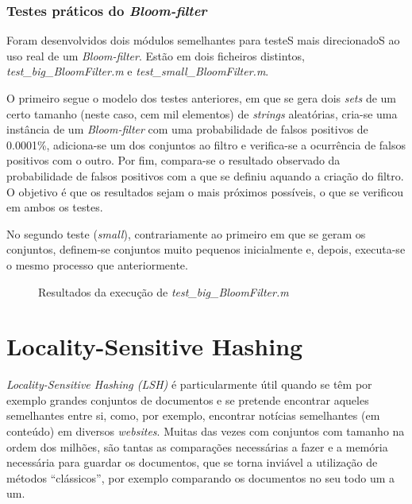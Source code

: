 \documentclass[a4paper,11pt,openright,oneside]{report}
\begin{document}
\subsection{Testes práticos do \textit{Bloom-filter}}
\label{subsec.testebloom}

Foram desenvolvidos dois módulos semelhantes para testeS mais direcionadoS ao uso real de um \textit{Bloom-filter}. Estão em dois ficheiros distintos, \textit{test\_big\_BloomFilter.m} e \textit{test\_small\_BloomFilter.m}.

O primeiro segue o modelo dos testes anteriores, em que se gera dois \textit{sets} de um certo tamanho (neste caso, cem mil elementos) de \textit{strings} aleatórias, cria-se uma instância de um \textit{Bloom-filter} com uma probabilidade de falsos positivos de 0.0001\%, adiciona-se um dos conjuntos ao filtro e verifica-se a ocurrência de falsos positivos com o outro. Por fim, compara-se o resultado observado da probabilidade de falsos positivos com a que se definiu aquando a criação do filtro. O objetivo é que os resultados sejam o mais próximos possíveis, o que se verificou em ambos os testes.

No segundo teste (\textit{small}), contrariamente ao primeiro em que se geram os conjuntos, definem-se conjuntos muito pequenos inicialmente e, depois, executa-se o mesmo processo que anteriormente.

\begin{figure}[ht]	
\center
{}
\caption{Resultados da execução de \textit{test\_big\_BloomFilter.m}}
\label{fig:testbigbloom}
\end{figure}

\chapter{Locality-Sensitive Hashing}
\label{chap.lsh}

\textit{Locality-Sensitive Hashing (LSH)} é particularmente útil quando se têm por exemplo grandes conjuntos de documentos e se pretende encontrar aqueles semelhantes entre si, como, por exemplo, encontrar notícias semelhantes (em conteúdo) em diversos \textit{websites}. Muitas das vezes com conjuntos com tamanho na ordem dos milhões, são tantas as comparações necessárias a fazer e a memória necessária para guardar os documentos, que se torna inviável a utilização de métodos ``clássicos'', por exemplo comparando os documentos no seu todo um a um.
\end{document}
